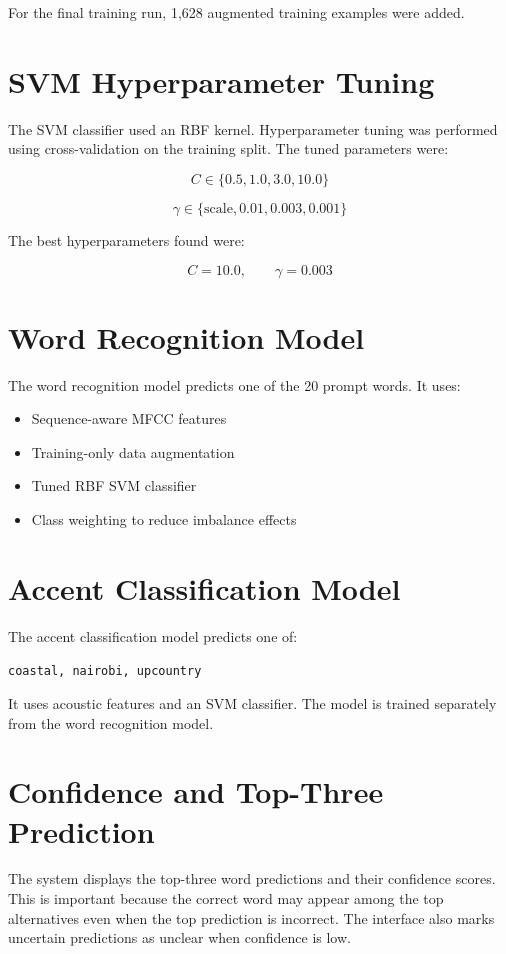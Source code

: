 \documentclass[12pt,a4paper]{report}
\begin{document}
For the final training run, 1,628 augmented training examples were added.

\section{SVM Hyperparameter Tuning}
The SVM classifier used an RBF kernel. Hyperparameter tuning was performed using cross-validation on the training split. The tuned parameters were:

\[
C \in \{0.5, 1.0, 3.0, 10.0\}
\]

\[
\gamma \in \{\text{scale}, 0.01, 0.003, 0.001\}
\]

The best hyperparameters found were:

\[
C = 10.0,\qquad \gamma = 0.003
\]

\section{Word Recognition Model}
The word recognition model predicts one of the 20 prompt words. It uses:

\begin{itemize}
    \item Sequence-aware MFCC features
    \item Training-only data augmentation
    \item Tuned RBF SVM classifier
    \item Class weighting to reduce imbalance effects
\end{itemize}

\section{Accent Classification Model}
The accent classification model predicts one of:

\begin{center}
\texttt{coastal, nairobi, upcountry}
\end{center}

It uses acoustic features and an SVM classifier. The model is trained separately from the word recognition model.

\section{Confidence and Top-Three Prediction}
The system displays the top-three word predictions and their confidence scores. This is important because the correct word may appear among the top alternatives even when the top prediction is incorrect. The interface also marks uncertain predictions as unclear when confidence is low.
\end{document}
